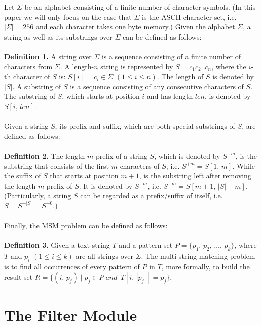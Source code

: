 Let $\Sigma$ be an \textsf{alphabet} consisting of a finite number of
character symbols. (In this paper we will only focus on the case that
$\Sigma$ is the ASCII character set, i.e. $|\Sigma| = 256$ and each
character takes one byte memory.) Given the alphabet $\Sigma$, a
\textsf{string} as well as its \textsf{substrings} over
$\Sigma$ can be defined as follows:\\
\\
\textbf{Definition 1.} A \textsf{string} over $\Sigma$ is a sequence
consisting of a finite number of characters from $\Sigma$. A
length-$n$ string is represented by $S = c_1c_2..c_n$, where the
$i$-th character of $S$ is: $S[i] = c_i \in \Sigma$
$(1 \leq i \leq n)$. The length of $S$ is denoted by $|S|$. A
\textsf{substring} of $S$ is a sequence consisting of any consecutive
characters of $S$. The substring of $S$, which starts at
position $i$ and has length $len$, is denoted by $S[i,\,len]$.\\
\\
Given a string $S$, its \textsf{prefix} and \textsf{suffix},
which are both special substrings of $S$, are defined as follows:\\
\\
\textbf{Definition 2.} The length-$m$ \textsf{prefix} of a string $S$,
which is denoted by $S^{+m}$, is the substring that consists of the
first $m$ characters of $S$, i.e. $S^{+m}=S[1,\,m]$.  While the
\textsf{suffix} of $S$ that starts at position $m+1$, is the substring
left after removing the length-$m$ prefix of $S$. It is denoted by
$S^{-m}$, i.e. $S^{-m} = S[m+1,\,|S|-m]$. (Particularly, a string $S$
can be regarded as a prefix/suffix of itself, i.e. $S=S^{+|S|}=S^{-0}$.)\\
\\
Finally, the MSM problem can be defined as follows: \\
\\
\textbf{Definition 3.} Given a text string $T$ and a pattern set
$P=\{p_1,\,p_2,\,\dots,\,p_k\}$, where $T$ and $p_i$
$(1 \leq i \leq k)$ are all strings over $\Sigma$. The multi-string
matching problem is to find all occurrences of every pattern of $P$ in
$T$, more formally, to build the result set
$R = \{(i,\, p_j)\;|\; p_j \in P\; and\,\; T[i,\,|p_j|]=p_j\}$.


\section{The Filter Module}
\label{sec:filter}

